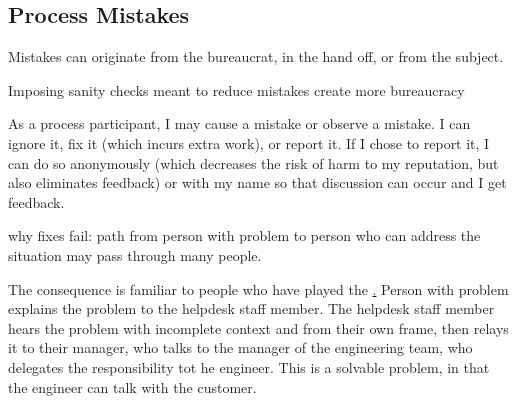 \subsection{Process Mistakes}

Mistakes can originate from the bureaucrat, in the hand off, or from the subject.

Imposing sanity checks meant to reduce mistakes create more bureaucracy 


As a process participant, I may cause a mistake or observe a mistake. I can ignore it, fix it (which incurs extra work), or report it. If I chose to report it, I can do so anonymously (which decreases the risk of harm to my reputation, but also eliminates feedback) or with my name so that discussion can occur and I get feedback.
    
    
    

why fixes fail: path from person with problem to person who can address the situation may pass through many people. 

The consequence is familiar to people who have played the \href{game of telephone}.
Person with problem explains the problem to the helpdesk staff member. The helpdesk staff member hears the problem with incomplete context and from their own frame, then relays it to their manager, who talks to the manager of the engineering team, who delegates the responsibility tot he engineer. 
This is a solvable problem, in that the engineer can talk with the customer. 


